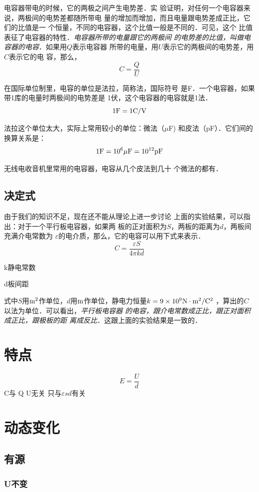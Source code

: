 \documentclass[10pt,cn]{elegantbook}
\begin{document}
 电容器带电的时候，它的两极之间产生电势差．实
 验证明，对任何一个电容器来说，两极间的电势差都随所带电
 量的增加而增加，而且电量跟电势差成正比，它们的比值是一
 个恒量，不同的电容器，这个比值一般是不同的．可见，这个
 比值表征了电容器的特性．\textit{电容器所带的电量跟它的两极间
 	的电势差的比值，叫做电容器的电容}．如果用$Q$表示电容器
 所带的电量，用$U$表示它的两极间的电势差，用$C$表示它的电
 容，那么，
 \[C=\frac{Q}{U} \]

 在国际单位制里，电容的单位是法拉，简称法，国际符号
 是F．一个电容器，如果带1库的电量时两极间的电势差是
 1伏，这个电容器的电容就是1法．
 \[1{\rm F}=1{\rm C}/{\rm V}\]
 
 法拉这个单位太大，实际上常用较小的单位：微法（$\mu$F)
 和皮法（pF）．它们间的换算关系是：
 \[1{\rm F}=10^6\mu{\rm F}=10^{12}{\rm pF}\]
 
 无线电收音机里常用的电容器，电容从几个皮法到几十
 个微法的都有．
  \subsection{决定式}


 	由于我们的知识不足，现在还不能从理论上进一步讨论
 上面的实验结果，可以指出：对于一个平行板电容器，如果两
 板的正对面积为$S$，两板的距离为$d$，两板间充满介电常数为
 $\varepsilon$的电介质，那么，它的电容可以用下式来表示．
 \[C=\dfrac{\varepsilon  S}{4\pi kd} \]
 
 k静电常数
 
 d板间距
 
 式中$S$用${\rm m^2}$作单位，$d$用${\rm m}$作单位，静电力恒量$k=9 \times 10^9{\rm N}\cdot {\rm m^2}/{\rm C^2}$
 ，算出的$C$以法为单位．可以看出，\textit{平行板电容器
 	的电容，跟介电常数成正比，跟正对面积成正比，跟极板的距
 	离成反比}．这跟上面的实验结果是一致的．
 
  \section{特点}

  \[E=\dfrac{U}{d}\]
C与	Q{} U无关{} 只与$\varepsilon s d$有关  
 \section{动态变化}
 
   \subsection{有源}
   
    \subsubsection{U不变}
    
\end{document}
